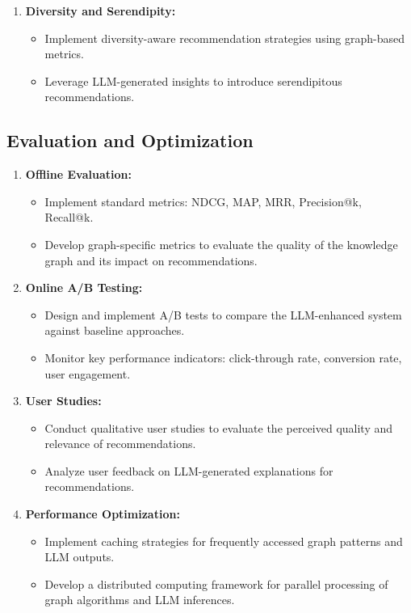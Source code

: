 \documentclass{article}
\begin{document}
\begin{enumerate}
    \item \textbf{Diversity and Serendipity:}
    \begin{itemize}
        \item Implement diversity-aware recommendation strategies using graph-based metrics.
        \item Leverage LLM-generated insights to introduce serendipitous recommendations.
    \end{itemize}
\end{enumerate}

\subsection{Evaluation and Optimization}
\begin{enumerate}
    \item \textbf{Offline Evaluation:}
    \begin{itemize}
        \item Implement standard metrics: NDCG, MAP, MRR, Precision@k, Recall@k.
        \item Develop graph-specific metrics to evaluate the quality of the knowledge graph and its impact on recommendations.
    \end{itemize}
    
    \item \textbf{Online A/B Testing:}
    \begin{itemize}
        \item Design and implement A/B tests to compare the LLM-enhanced system against baseline approaches.
        \item Monitor key performance indicators: click-through rate, conversion rate, user engagement.
    \end{itemize}
    
    \item \textbf{User Studies:}
    \begin{itemize}
        \item Conduct qualitative user studies to evaluate the perceived quality and relevance of recommendations.
        \item Analyze user feedback on LLM-generated explanations for recommendations.
    \end{itemize}
    
    \item \textbf{Performance Optimization:}
    \begin{itemize}
        \item Implement caching strategies for frequently accessed graph patterns and LLM outputs.
        \item Develop a distributed computing framework for parallel processing of graph algorithms and LLM inferences.
    \end{itemize}
    

\end{enumerate}
\end{document}
